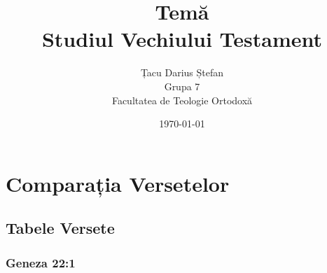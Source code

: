 \documentclass[12pt,a4paper]{article}
\title{Temă \\ Studiul Vechiului Testament}
\author{Țacu Darius Ștefan \\ Grupa 7 \\ Facultatea de Teologie Ortodoxă}
\date{\today}
\begin{document}
\maketitle

\section{Comparația Versetelor}


\subsection{Tabele Versete}

\subsubsection{Geneza 22:1}
\end{document}
